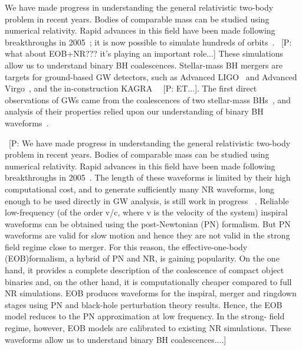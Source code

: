\documentclass[aps,prd,amsfonts,amssymb,amsmath,nofootinbib,showpacs,superscriptaddress,twocolumn,floatfix]{revtex4-1}
\newcommand{\pcm}[1]{{\color{blue}~\textsf{[P: #1]}}}
\begin{document}
We have made progress in understanding the general relativistic two-body problem in recent years. Bodies of comparable mass can be studied using numerical relativity. Rapid advances in this field have been made following breakthroughs in 2005~\cite{Pretorius2005,Campanelli2006,Baker2006}; it is now possible to simulate hundreds of orbits~\cite{Szilagyi2015}. \pcm{what about EOB+NR??? it's playing an important role...} These simulations allow us to understand binary BH coalescences. Stellar-mass BH mergers are targets for ground-based GW detectors, such as Advanced LIGO~\cite{Aasi2015} and Advanced Virgo~\cite{Acernese2015}, and the in-construction KAGRA~\cite{Aso2013} \pcm{ET...}. The first direct observations of GWs came from the coalescences of two stellar-mass BHs~\cite{Abbott2016,Abbott2016e,Abbott2016d}, and analysis of their properties relied upon our understanding of binary BH waveforms~\cite{Abbott2016f,Abbott2016h,Abbott2016d}. %

\pcm{We have made progress in understanding the general relativistic two-body problem in recent years. Bodies of comparable mass can be studied using numerical relativity. Rapid advances in this field have been made following breakthroughs in 2005~\cite{Pretorius2005,Campanelli2006,Baker2006}. The length of these waveforms is limited by their high computational cost, and to generate sufficiently many NR waveforms, long enough to be used directly in GW analysis, is still work in progress ~\cite{Szilagyi2015}. Reliable low-frequency (of the order v/c, where v is the velocity of the system) inspiral waveforms can be obtained using the post-Newtonian (PN) formalism. But PN waveforms are valid for slow motion and hence they are not valid in the strong field regime close to merger. For this reason, the effective-one-body (EOB)formalism, a hybrid of PN and NR, is gaining popularity. On the one hand, it provides a complete description of the coalescence of compact object binaries and, on the other hand, it is computationally cheaper compared to full NR simulations. EOB produces waveforms for the inspiral, merger and ringdown stages using PN and black-hole perturbation theory results. Hence, the EOB model reduces to the PN approximation at low frequency. In the strong- field regime, however, EOB models are calibrated to existing NR simulations. These waveforms allow us to understand binary BH coalescences....}
\end{document}
